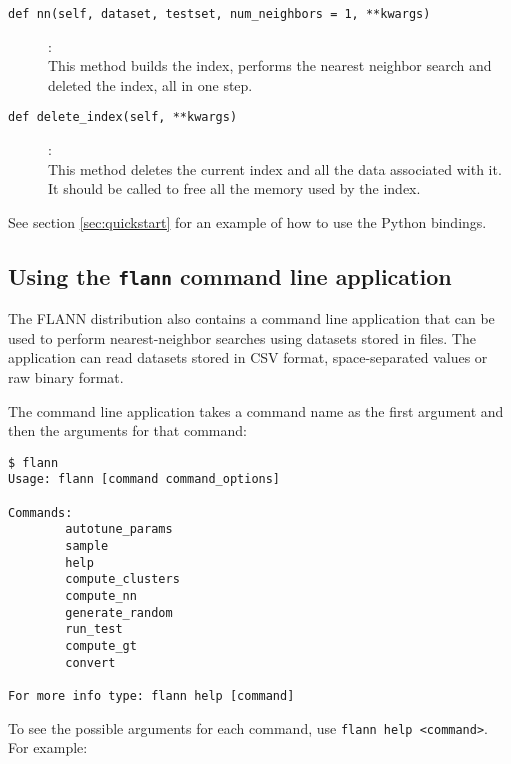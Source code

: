 \documentclass[letter,10pt]{article}
\begin{document}
\begin{description}
\item[\texttt{def nn(self, dataset, testset, num\_neighbors = 1, **kwargs)}]:\\
    This method builds the index, performs the nearest neighbor search and
deleted the index, all in one step.

\item [\texttt{def delete\_index(self, **kwargs)}] :\\
    This method deletes the current index and all the data associated with it.
It should be called to free all the memory used by the index.

\end{description}


See section \ref{sec:quickstart} for an example of how to use the Python
bindings.


\subsection{Using the \texttt{flann} command line application}

The FLANN distribution also contains a command line application that can be
used to perform nearest-neighbor searches using datasets stored in files. The
application can read datasets stored in CSV format, space-separated values or
raw binary format.

The command line application takes a command name as the first argument and
then the arguments for that command:
\begin{Verbatim}[fontsize=\footnotesize,frame=single]
$ flann
Usage: flann [command command_options]

Commands:
        autotune_params
        sample
        help
        compute_clusters
        compute_nn
        generate_random
        run_test
        compute_gt
        convert

For more info type: flann help [command]
\end{Verbatim}

To see the possible arguments for each command, use \texttt{flann help
<command>}. For example:
\end{document}
